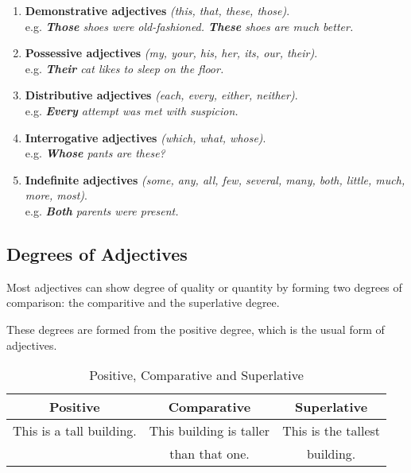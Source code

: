 \documentclass[hidelinks,10pt,a4paper]{article}
\begin{document}
\begin{enumerate}[label=(\alph*)]
	\item \textbf{Demonstrative adjectives} \textit{(this, that, these, those)}. \\
		e.g. \textit{\textbf{Those} shoes were old-fashioned. \textbf{These} shoes are much better.}
	\item \textbf{Possessive adjectives} \textit{(my, your, his, her, its, our, their)}. \\
		e.g. \textit{\textbf{Their} cat likes to sleep on the floor.}
	\item \textbf{Distributive adjectives} \textit{(each, every, either, neither)}. \\
		e.g. \textit{\textbf{Every} attempt was met with suspicion.}
	\item \textbf{Interrogative adjectives} \textit{(which, what, whose)}. \\
		e.g. \textit{\textbf{Whose} pants are these?}
	\item \textbf{Indefinite adjectives} \textit{(some, any, all, few, several, many, both, little, much, more, most)}. \\
		e.g. \textit{\textbf{Both} parents were present.}
\end{enumerate}


\subsection{Degrees of Adjectives}

Most adjectives can show degree of quality or quantity by forming two degrees of comparison: the comparitive and the superlative degree.

These degrees are formed from the positive degree, which is the usual form of adjectives.

\begin{table}[h]
\begin{center}
\begin{tabular}{|c|c|c|}
	\hline
	\textbf{Positive} & \textbf{Comparative} & \textbf{Superlative} \\ \hline
	This is a tall building. & This building is taller & This is the tallest \\
	& than that one. & building. \\ \hline
\end{tabular}
\end{center}
\caption{Positive, Comparative and Superlative} \label{tab:pcs}
\end{table}
\end{document}
